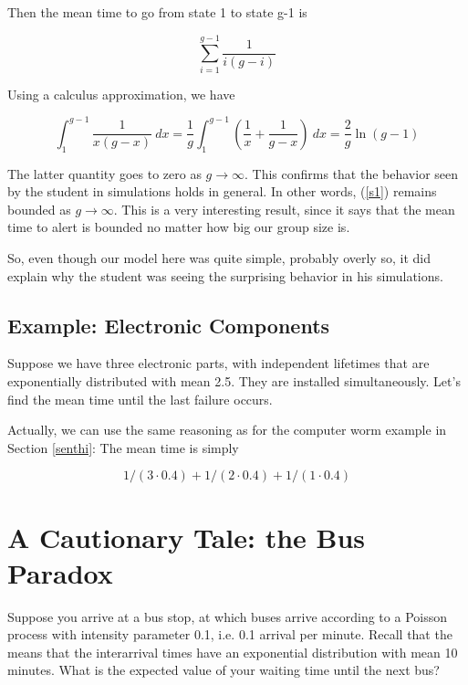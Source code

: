 
Then the mean time to go from state 1 to state g-1 is

\begin{equation}
\label{s1}
\sum_{i=1}^{g-1} \frac{1}{i(g-i)}
\end{equation}

Using a calculus approximation, we have

\begin{equation}
\int_1^{g-1} \frac{1}{x(g-x)} ~ dx = \frac{1}{g} \int_1^{g-1}
(\frac{1}{x} +
\frac{1}{g-x}) ~ dx = \frac{2}{g} \ln(g-1)
\end{equation}

The latter quantity goes to zero as $g \rightarrow \infty$.  This
confirms that the behavior seen by the student in simulations holds in
general.  In other words, (\ref{s1}) remains bounded as $g \rightarrow
\infty$.  This is a very interesting result, since it says that the mean
time to alert is bounded no matter how big our group size is.

So, even though our model here was quite simple, probably overly so, it
did explain why the student was seeing the surprising behavior in his
simulations.

\subsection{Example:  Electronic Components}

Suppose we have three electronic parts, with independent lifetimes that
are exponentially distributed with mean 2.5.  They are installed
simultaneously.  Let's find the mean time until the last failure occurs.

Actually, we can use the same reasoning as for the computer worm example
in Section \ref{senthi}:  The mean time is simply

\begin{equation}
1/(3 \cdot 0.4) + 1/(2 \cdot 0.4) + 1/(1 \cdot 0.4)
\end{equation}

\section{A Cautionary Tale:  the Bus Paradox}
\label{busparadox}

Suppose you arrive at a bus stop, at which buses arrive according to a
Poisson process with intensity parameter 0.1, i.e. 0.1 arrival per
minute.  Recall that the means that the interarrival times have an
exponential distribution with mean 10 minutes. What is the expected
value of your waiting time until the next bus?

